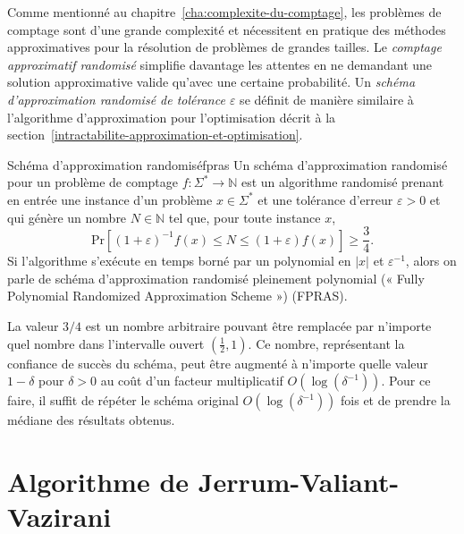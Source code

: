 Comme mentionné au chapitre~\ref{cha:complexite-du-comptage}, les problèmes de comptage sont d'une grande complexité et nécessitent en pratique des méthodes approximatives pour la résolution de problèmes de grandes tailles. Le \textit{comptage approximatif randomisé} simplifie davantage les attentes en ne demandant une solution approximative valide qu'avec une certaine probabilité. Un \textit{schéma d'approximation randomisé de tolérance $\varepsilon$} se définit de manière similaire à l'algorithme d'approximation pour l'optimisation décrit à la section~\ref{intractabilite-approximation-et-optimisation}. 

\begin{maindefinition}{Schéma d'approximation randomisé}{fpras}
    Un schéma d'approximation randomisé pour un problème de comptage $f: \Sigma^{*} \to \mathbb{N}$ est un algorithme randomisé prenant en entrée une instance d'un problème $x \in \Sigma^{*}$ et une tolérance d'erreur $\varepsilon > 0$ et qui génère un nombre $N \in \mathbb{N}$ tel que, pour toute instance $x$,
    \begin{equation*}
        \mathrm{ Pr }\left[(1+\varepsilon)^{-1} f(x) \leq N \leq (1+\varepsilon)f(x)\right] \geq \frac{3}{4} .
    \end{equation*}
    Si l'algorithme s'exécute en temps borné par un polynomial en $\lvert x \rvert$ et $\varepsilon^{-1}$, alors on parle de schéma d'approximation randomisé pleinement polynomial (« Fully Polynomial Randomized Approximation Scheme ») (FPRAS).
\end{maindefinition}

La valeur $3/4$ est un nombre arbitraire pouvant être remplacée par n'importe quel nombre dans l'intervalle ouvert $(\frac{1}{2}, 1)$. Ce nombre, représentant la confiance de succès du schéma, peut être augmenté à n'importe quelle valeur $1-\delta$ pour $\delta > 0$ au coût d'un facteur multiplicatif $O(\log(\delta^{-1}))$. Pour ce faire, il suffit de répéter le schéma original $O(\log(\delta^{-1}))$ fois et de prendre la médiane des résultats obtenus.   


\section{Algorithme de Jerrum-Valiant-Vazirani}
\label{sec:algorithme-jvv}

